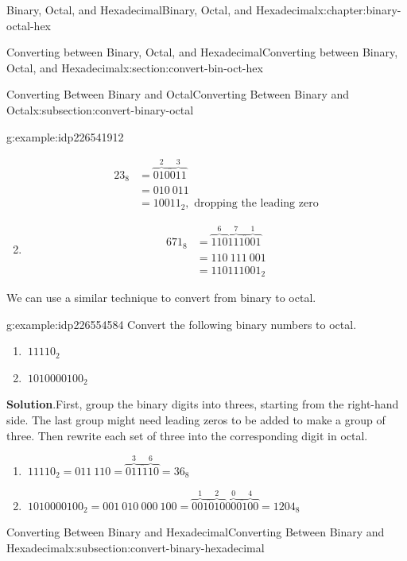 \documentclass[twoside,10pt,]{book}
\newcommand{\blocktitlefont}{\relax}
\numberwithin{equation}{section}
\newcommand{\amp}{&}
\begin{document}
\begin{chapterptx}{Binary, Octal, and Hexadecimal}{}{Binary, Octal, and Hexadecimal}{}{}{x:chapter:binary-octal-hex}
\begin{sectionptx}{Converting between Binary, Octal, and Hexadecimal}{}{Converting between Binary, Octal, and Hexadecimal}{}{}{x:section:convert-bin-oct-hex}
\begin{subsectionptx}{Converting Between Binary and Octal}{}{Converting Between Binary and Octal}{}{}{x:subsection:convert-binary-octal}
\begin{example}{}{g:example:idp226541912}
\begin{enumerate}
\begin{align*}
23_8 \amp = \overbrace{010}^2\overbrace{011}^3\\
\amp = 010\ 011\\
\amp = 10011_2,\text{ dropping the leading zero}
\end{align*}
%
\item{}%
\begin{align*}
671_8 \amp = \overbrace{110}^6\overbrace{111}^7\overbrace{001}^1\\
\amp = 110\ 111\ 001\\
\amp = 110111001_2
\end{align*}
%
\end{enumerate}
\end{example}
%
\par
We can use a similar technique to convert from binary to octal.  \begin{example}{}{g:example:idp226554584}%
Convert the following binary numbers to octal. %
\begin{enumerate}
\item{}\(\displaystyle \ 11110_2\)%
\item{}\(\displaystyle \ 1010000100_2\)%
\end{enumerate}
\par\smallskip%
\noindent\textbf{\blocktitlefont Solution}.\label{g:solution:idp226555992}{}\hypertarget{g:solution:idp226555992}{}\quad{}First, group the binary digits into threes, starting from the right-hand side.  The last group might need leading zeros to be added to make a group of three.  Then rewrite each set of three into the corresponding digit in octal. %
\begin{enumerate}
\item{}\(\displaystyle \ 11110_2=011\ 110=\overbrace{011}^3\overbrace{110}^6=36_8\)%
\item{}\(\displaystyle \ 1010000100_2=001\ 010\ 000\ 100=\overbrace{001}^1\overbrace{010}^2\overbrace{000}^0\overbrace{100}^4=1204_8\)%
\end{enumerate}
\end{example}
%
\end{subsectionptx}
%
%
\typeout{************************************************}
\typeout{************************************************}
%
\begin{subsectionptx}{Converting Between Binary and Hexadecimal}{}{Converting Between Binary and Hexadecimal}{}{}{x:subsection:convert-binary-hexadecimal}

\end{subsectionptx}
\end{sectionptx}
\end{chapterptx}
\end{document}
